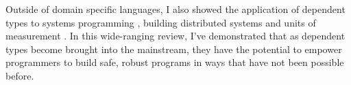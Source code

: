 Outside of domain specific languages, I also showed the application of dependent
types to systems programming \cite{idris_systems_programming}, building
distributed systems \cite{fstar_distributed_programming} and units of
measurement \cite{gundry2013}. In this wide-ranging review, I've demonstrated
that as dependent types become brought into the mainstream, they have the
potential to empower programmers to build safe, robust programs in ways that
have not been possible before. 